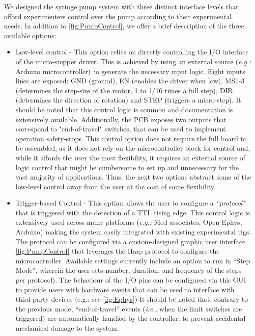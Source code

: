 We designed the syringe pump system with three distinct interface levels that afford experimenters control over the pump according to their experimental needs. In addition to \cref{fig:PumpControl}, we offer a brief description of the three available options:
\begin{itemize}

\item{Low-level control} - This option relies on directly controlling the I/O interface of the micro-stepper driver. This is achieved by using an external source (\textit{e.g.:} Arduino microcontroller) to generate the necessary input logic. Eight inputs lines are exposed: GND (ground), EN (enables the driver when low), MS1-3 (determines the step-size of the motor, 1 to 1/16 times a full step), DIR (determines the direction of rotation) and STEP (triggers a micro-step). It should be noted that this control logic is common and documentation is extensively available.
Additionally, the PCB exposes two outputs that correspond to "end-of-travel" switches, that can be used to implement operation safety-stops.
This control option does not require the full board to be assembled, as it does not rely on the microcontroller block for control and, while it affords the user the most flexibility, it requires an external source of logic control that might be cumbersome to set up and unnecessary for the vast majority of applications. Thus, the next two options abstract some of the low-level control away from the user at the cost of some flexibility.

\item{Trigger-based Control} - This option allows the user to configure a \textit{“protocol”} that is triggered with the detection of a TTL rising edge. This control logic is extensively used across many platforms (\textit{e.g.:} Med associates, Open-Ephys, Arduino) making the system easily integrated with existing experimental rigs.
The protocol can be configured via a custom-designed graphic user interface \ref{fig:PumpControl} that leverages the Harp protocol to configure the microcontroller. Available settings currently include an option to run in “Step Mode”, wherein the user sets number, duration, and frequency of the steps per protocol). The behaviour of the I/O pins can be configured via this GUI to provide users with hardware events that can be used to interface with third-party devices (e.g.: see \ref{fig:Ephys})
It should be noted that, contrary to the previous mode, “end-of-travel” events (\textit{i.e.,} when the limit switches are triggered) are automatically handled by the controller, to prevent accidental mechanical damage to the system.


\end{itemize}
